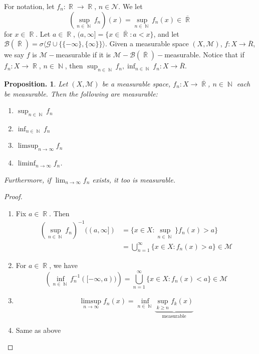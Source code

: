 \documentclass[11pt, a4paper]{memoir}
\DeclareMathOperator{\N}{{\mathbb{N}}}
\DeclareMathOperator{\R}{{\mathbb{R}}}
\theoremstyle{change}
\newtheorem{proposition}[theorem]{Proposition.}
\theoremstyle{plain}
\theoremstyle{nonumberplain}
\newtheorem{proof}{Proof}
\begin{document}
For notation, let $f_n:\R\to\R$, $n\in\mathcal{N}$.
We let
\begin{equation}
    (\sup_{n\in\N} f_n)(x)=\sup_{n\in\N} f_n(x)\in\overline{\R}
\end{equation}
for $x\in \R$.
Let $a\in\R$, $(a,\infty]=\{x\in\overline{\R}:a<x\}$, and let $\mathcal{B}(\overline{\R})=\sigma\langle\mathcal{G}\cup\{\{-\infty\},\{\infty\}\}\rangle$.
Given a measurable space $(X,\mathcal{M})$, $f:X\to\overline{R}$, we say $f$ is $\mathcal{M}-$measurable if it is $\mathcal{M}-\mathcal{B}(\overline{\R})-$measurable.
Notice that if $f_n:X\to\R$, $n\in\N$, then $\sup_{n\in\N}f_n,\inf_{n\in\N}f_n:X\to\overline{R}$.
\begin{proposition}
    Let $(X,\mathcal{M})$ be a measurable space, $f_n:X\to\overline{\R}$, $n\in\N$ each be measurable.
    Then the following are measurable:
    \begin{enumerate}
        \item $\sup_{n\in\N}f_n$
        \item $\inf_{n\in\N}f_n$
        \item $\limsup_{n\to\infty}f_n$
        \item $\liminf_{n\to\infty}f_n$.
    \end{enumerate}
    Furthermore, if $\lim_{n\to\infty}f_n$ exists, it too is measurable.
\end{proposition}
\begin{proof}
    \begin{enumerate}
        \item Fix $a\in\R$.
            Then
            \begin{align*}
                \left(\sup_{n\in\N}f_n\right)^{-1}((a,\infty]) &= \{x\in X:\sup_{n\in\N}\}f_n(x)>a\}\\ %
                                                               &=\bigcup_{n=1}^\infty\{x\in X:f_n(x)>a\}\in\mathcal{M}
            \end{align*}
        \item For $a\in\R$, we have
            \begin{equation*}
                \left(\inf_{n\in\N}f_n^{-1}([-\infty,a))\right)=\bigcup_{n=1}^\infty\{x\in X:f_n(x)<a\}\in\mathcal{M} %
            \end{equation*}
        \item
            \begin{equation*}
                \limsup_{n\to\infty}f_n(x)=\inf_{n\in\N}\underbrace{\sup_{k\geq n}f_k(x)}_{\text{measurable}}
            \end{equation*}
        \item Same as above
    \end{enumerate}
\end{proof}
\end{document}
